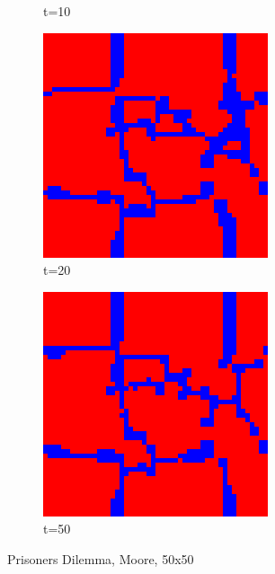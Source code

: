 \documentclass[a4paper, 11pt]{article}
\begin{document}
\begin{figure}[H]
\begin{subfigure}{.16\textwidth}
  \caption{t=10}
\end{subfigure}%
\begin{subfigure}{.16\textwidth}
  \centering
  \includegraphics[width=0.9\linewidth]{PRISONERS_DILEMMA_MOORE_50x50_t20}
  \caption{t=20}
\end{subfigure}%
\begin{subfigure}{.16\textwidth}
  \centering
  \includegraphics[width=0.9\linewidth]{PRISONERS_DILEMMA_MOORE_50x50_t50}
  \caption{t=50}
\end{subfigure}
\caption{Prisoners Dilemma, Moore, 50x50}
\end{figure}
\end{document}
